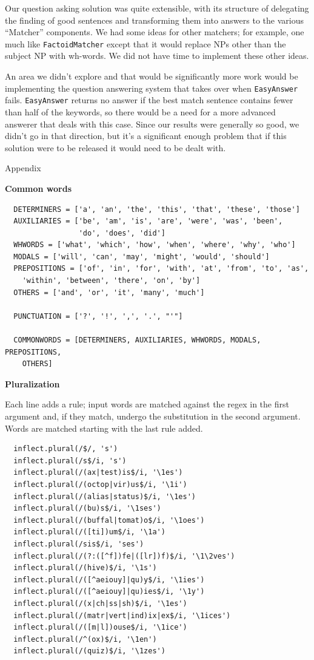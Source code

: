 \documentclass[11pt]{article}
\begin{document}
Our question asking solution was quite extensible, with its structure of
delegating the finding of good sentences and transforming them into answers to
the various ``Matcher'' components. We had some ideas for other matchers; for
example, one much like \texttt{FactoidMatcher} except that it would replace NPs other
than the subject NP with wh-words. We did not have time to implement these other
ideas.

An area we didn't explore and that would be significantly more work would be
implementing the question answering system that takes over when \texttt{EasyAnswer}
fails. \texttt{EasyAnswer} returns no answer if the best match sentence contains fewer
than half of the keywords, so there would be a need for a more advanced answerer
that deals with this case. Since our results were generally so good, we didn't
go in that direction, but it's a significant enough problem that if this
solution were to be released it would need to be dealt with.

\newpage

\begin{center}
  \Large{Appendix}
\end{center}

\noindent\large{\bf Common words}
\begin{verbatim}
  DETERMINERS = ['a', 'an', 'the', 'this', 'that', 'these', 'those']
  AUXILIARIES = ['be', 'am', 'is', 'are', 'were', 'was', 'been',
                 'do', 'does', 'did']
  WHWORDS = ['what', 'which', 'how', 'when', 'where', 'why', 'who']
  MODALS = ['will', 'can', 'may', 'might', 'would', 'should']
  PREPOSITIONS = ['of', 'in', 'for', 'with', 'at', 'from', 'to', 'as',
    'within', 'between', 'there', 'on', 'by']
  OTHERS = ['and', 'or', 'it', 'many', 'much']

  PUNCTUATION = ['?', '!', ',', '.', "'"]

  COMMONWORDS = [DETERMINERS, AUXILIARIES, WHWORDS, MODALS, PREPOSITIONS,
    OTHERS]
\end{verbatim}


\noindent\large{\bf Pluralization}

\noindent Each line adds a rule; input words are matched against the regex
in the first argument and, if they match, undergo the substitution in the
second argument. Words are matched starting with the last rule added.
\begin{verbatim}
  inflect.plural(/$/, 's')
  inflect.plural(/s$/i, 's')
  inflect.plural(/(ax|test)is$/i, '\1es')
  inflect.plural(/(octop|vir)us$/i, '\1i')
  inflect.plural(/(alias|status)$/i, '\1es')
  inflect.plural(/(bu)s$/i, '\1ses')
  inflect.plural(/(buffal|tomat)o$/i, '\1oes')
  inflect.plural(/([ti])um$/i, '\1a')
  inflect.plural(/sis$/i, 'ses')
  inflect.plural(/(?:([^f])fe|([lr])f)$/i, '\1\2ves')
  inflect.plural(/(hive)$/i, '\1s')
  inflect.plural(/([^aeiouy]|qu)y$/i, '\1ies')
  inflect.plural(/([^aeiouy]|qu)ies$/i, '\1y')
  inflect.plural(/(x|ch|ss|sh)$/i, '\1es')
  inflect.plural(/(matr|vert|ind)ix|ex$/i, '\1ices')
  inflect.plural(/([m|l])ouse$/i, '\1ice')
  inflect.plural(/^(ox)$/i, '\1en')
  inflect.plural(/(quiz)$/i, '\1zes')
\end{verbatim}
\end{document}
